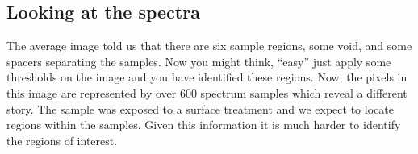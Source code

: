 \documentclass[letterpaper,10pt,english]{sphinxmanual}
\begin{document}
\noindent{}


\subsection{Looking at the spectra}
\label{\detokenize{ML4NeutronImageSegmentation:looking-at-the-spectra}}
The average image told us that there are six sample regions, some void, and some spacers separating the samples. Now you might think, “easy” just apply some thresholds on the image and you have identified these regions. Now, the pixels in this image are represented by over 600 spectrum samples which reveal a different story. The sample was exposed to a surface treatment and we expect to locate regions within the samples. Given this information it is much harder to identify the regions of interest.
\end{document}
